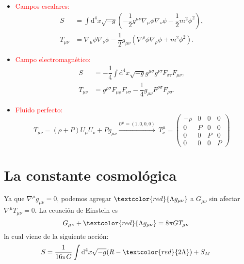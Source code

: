 \documentclass[../main]{subfiles}
\begin{document}
\begin{adjustwidth}{0pt}{-100pt}
\ejemplo{}
\begin{itemize}
    \item \textcolor{red}{Campos escalares:}
    \begin{align}
        S &= \int \mathrm{d}^4 x \sqrt{-g} \left(-\dfrac{1}{2}g^{\mu\nu}\nabla_{\mu}\phi\nabla_{\nu}\phi-\dfrac{1}{2}m^2\phi^2\right),\\
        T_{\mu\nu} &= \nabla_{\mu}\phi \nabla_{\nu}\phi-\dfrac{1}{2}g_{\mu\nu}(\nabla^{\rho}\phi\nabla_{\rho}\phi+m^2\phi^2).
    \end{align}
    \item \textcolor{red}{Campo electromagnético:}
    \begin{align}
        S & = -\dfrac{1}{4}\int \mathrm{d}^4 x\sqrt{-g} g^{\mu\sigma}g^{\nu \tau} F_{\sigma \tau} F_{\mu\nu}, \\
        T_{\mu\nu} & = g^{\rho\sigma} F_{\mu\rho}F_{\nu\sigma}-\dfrac{1}{4}g_{\mu\nu}F^{\rho\sigma}F_{\rho\sigma}.
    \end{align}
    \item \textcolor{red}{Fluido perfecto:}
    \begin{equation}
        T_{\mu\nu}=(\rho+P)U_{\mu}U_{\nu}+Pg_{\mu\nu} \xrightarrow[]{U^{\mu}=(1, 0, 0, 0)} \ T^{\mu}_{\nu}=
        \begin{pmatrix}
            -\rho & 0 & 0 & 0 \\
            0     & P & 0 & 0 \\
            0     & 0 & P & 0 \\
            0     & 0 & 0 & P
        \end{pmatrix}
    \end{equation}
\end{itemize}

\section{La constante cosmológica}\label{part5.4}

Ya que $\nabla^{\mu} g_{\mu\nu}=0$, podemos agregar $\textcolor{red}{\Lambda g_{\mu\nu}}$ a $G_{\mu\nu}$ sin afectar $\nabla^{\mu}T_{\mu\nu}=0$. La ecuación de Einstein es 
\begin{equation}
    G_{\mu\nu}+\textcolor{red}{\Lambda g_{\mu\nu}}=8\pi G T_{\mu\nu}
\end{equation}
la cual viene de la siguiente acción:
\begin{equation}
    S = \dfrac{1}{16\pi G} \int \mathrm{d}^4 x\sqrt{-g} (R-\textcolor{red}{2\Lambda})+S_M
\end{equation}


\end{adjustwidth}
\end{document}
